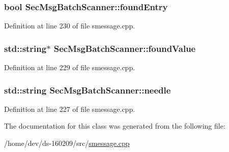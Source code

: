 \subsubsection[{found\+Entry}]{\setlength{\rightskip}{0pt plus 5cm}bool Sec\+Msg\+Batch\+Scanner\+::found\+Entry}\label{class_sec_msg_batch_scanner_a1842d0e149b314a7beb82cc4840f5565}


Definition at line 230 of file smessage.\+cpp.

\hypertarget{class_sec_msg_batch_scanner_a1f9a62489af577112cbe0db50e155e58}{}
\subsubsection[{found\+Value}]{\setlength{\rightskip}{0pt plus 5cm}std\+::string$\ast$ Sec\+Msg\+Batch\+Scanner\+::found\+Value}\label{class_sec_msg_batch_scanner_a1f9a62489af577112cbe0db50e155e58}


Definition at line 229 of file smessage.\+cpp.

\hypertarget{class_sec_msg_batch_scanner_a15f820824b8c5f64a3fba97b9133a50e}{}
\subsubsection[{needle}]{\setlength{\rightskip}{0pt plus 5cm}std\+::string Sec\+Msg\+Batch\+Scanner\+::needle}\label{class_sec_msg_batch_scanner_a15f820824b8c5f64a3fba97b9133a50e}


Definition at line 227 of file smessage.\+cpp.



The documentation for this class was generated from the following file\+:\begin{DoxyCompactItemize}
\item 
/home/dev/ds-\/160209/src/\hyperlink{smessage_8cpp}{smessage.\+cpp}\end{DoxyCompactItemize}
